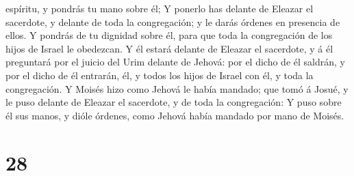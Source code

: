 espíritu, y pondrás tu mano sobre él;  Y ponerlo has
delante de Eleazar el sacerdote, y delante de toda la congregación; y le
darás órdenes en presencia de ellos.  Y pondrás de tu
dignidad sobre él, para que toda la congregación de los hijos de Israel
le obedezcan.  Y él estará delante de Eleazar el sacerdote,
y á él preguntará por el juicio del Urim delante de Jehová: por el dicho
de él saldrán, y por el dicho de él entrarán, él, y todos los hijos de
Israel con él, y toda la congregación.  Y Moisés hizo como
Jehová le había mandado; que tomó á Josué, y le puso delante de Eleazar
el sacerdote, y de toda la congregación:  Y puso sobre él
sus manos, y dióle órdenes, como Jehová había mandado por mano de
Moisés.

\hypertarget{section-27}{%
\section{28}\label{section-27}}

